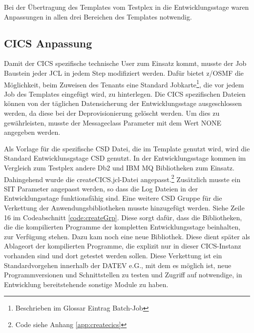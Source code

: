Bei der Übertragung des Templates vom Testplex in die Entwicklungsstage waren Anpassungen in allen drei Bereichen des Templates notwendig.

\subsection{CICS Anpassung}\label{ssec:cicsentw}
Damit der CICS spezifische technische User zum Einsatz kommt, musste der \glqq Job\grqq{} Baustein jeder JCL in jedem Step modifiziert werden.
Dafür bietet z/OSMF die Möglichkeit, beim Zuweisen des \glqq Tenants\grqq{} eine Standard Jobkarte\footnote{Beschrieben im Glossar Eintrag \Gls{Batch-Job}}, die vor jedem Job des Templates eingefügt wird, zu hinterlegen.
Die CICS spezifischen Dateien können von der täglichen Datensicherung der Entwicklungsstage ausgeschlossen werden, da diese bei der Deprovisionierung gelöscht werden.
Um dies zu gewährleisten, musste der Messageclass Parameter mit dem Wert  \glqq NONE\grqq{} angegeben werden.

Als Vorlage für die spezifische CSD Datei, die im Template genutzt wird, wird die Standard Entwicklunsgstage CSD genutzt.
In der Entwicklungsstage kommen im Vergleich zum Testplex andere Db2 und IBM MQ Bibliotheken zum Einsatz.
Dahingehend wurde die \glqq createCICS.jcl\grqq-Datei angepasst.\footnote{Code siehe Anhang \ref{app:createcics}}
Zusätzlich musste ein SIT Parameter angepasst werden, so dass die Log Dateien in der Entwicklungsstage funktionsfähig sind.
Eine weitere CSD Gruppe für die Verkettung der Anwendungsbibliotheken musste hinzugefügt werden.
Siehe Zeile 16 im Codeabschnitt \ref{code:createGrp}.
Diese sorgt dafür, dass die Bibliotheken, die die kompilierten Programme der kompletten Entwicklungsstage beinhalten, zur Verfügung stehen. 
Dazu kam noch eine neue Bibliothek.
Diese dient später als Ablageort der kompilierten Programme, die explizit nur in dieser CICS-Instanz vorhanden sind und dort getestet werden sollen.
Diese Verkettung ist ein Standardvorgehen innerhalb der DATEV e.G., mit dem es möglich ist, neue Programmversionen und Schnittstellen zu testen und Zugriff auf notwendige, in Entwicklung bereitstehende sonstige Module zu haben.

